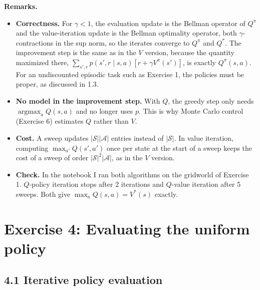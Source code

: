 \documentclass[letterpaper, 11pt]{article}
\newcommand{\1}{\mathds{1}}	%
\DeclareMathOperator*{\argmax}{argmax}    %
\theoremstyle{definition}
\begin{document}
\textbf{Remarks.}
\begin{itemize}
  \item \textbf{Correctness.} For $\gamma < 1$, the evaluation update is the Bellman operator of $Q^\pi$ and the value-iteration update is the Bellman optimality operator, both $\gamma$-contractions in the sup norm, so the iterates converge to $Q^\pi$ and $Q^*$. The improvement step is the same as in the $V$ version, because the quantity maximized there, $\sum_{s', r} p(s', r \mid s, a)[r + \gamma V^\pi(s')]$, is exactly $Q^\pi(s, a)$. For an undiscounted episodic task such as Exercise 1, the policies must be proper, as discussed in 1.3.
  \item \textbf{No model in the improvement step.} With $Q$, the greedy step only needs $\argmax_a Q(s, a)$ and no longer uses $p$. This is why Monte Carlo control (Exercise 6) estimates $Q$ rather than $V$.
  \item \textbf{Cost.} A sweep updates $|\mathcal{S}||\mathcal{A}|$ entries instead of $|\mathcal{S}|$. In value iteration, computing $\max_{a'} Q(s', a')$ once per state at the start of a sweep keeps the cost of a sweep of order $|\mathcal{S}|^2 |\mathcal{A}|$, as in the $V$ version.
  \item \textbf{Check.} In the notebook I ran both algorithms on the gridworld of Exercise 1. $Q$-policy iteration stops after 2 iterations and $Q$-value iteration after 5 sweeps. Both give $\max_a Q(s, a) = V^*(s)$ exactly.
\end{itemize}

\section*{Exercise 4: Evaluating the uniform policy}

\subsection*{4.1 Iterative policy evaluation}
\end{document}
